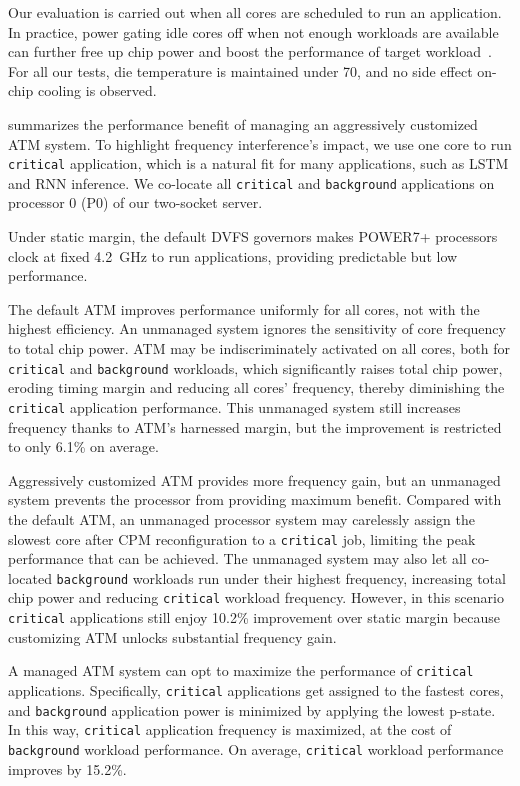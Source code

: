 Our evaluation is carried out when all cores are scheduled to run an application. In practice, power gating idle cores off when not enough workloads are available can further free up chip power and boost the performance of target workload~\cite{zu2015adaptive}. For all our tests, die temperature is maintained under 70\C, and no side effect on-chip cooling is observed. 

 summarizes the performance benefit of managing an aggressively customized ATM system. To highlight frequency interference's impact, we use one core to run \texttt{critical} application, which is a natural fit for many applications, such as LSTM and RNN inference. We co-locate all \texttt{critical} and \texttt{background} applications on processor 0 (P0) of our two-socket server.

Under static margin, the default DVFS governors makes POWER7+ processors clock at fixed 4.2~GHz to run applications, providing predictable but low performance. 

The default ATM improves performance uniformly for all cores, not with the highest efficiency. An unmanaged system ignores the sensitivity of core frequency to total chip power. ATM may be indiscriminately activated on all cores, both for \texttt{critical} and \texttt{background} workloads, which significantly raises total chip power, eroding timing margin and reducing all cores' frequency, thereby diminishing the \texttt{critical} application performance. This unmanaged system still increases frequency thanks to ATM's harnessed margin, but the improvement is restricted to only 6.1\% on average.

Aggressively customized ATM provides more frequency gain, but an unmanaged system prevents the processor from providing maximum benefit. Compared with the default ATM, an unmanaged processor system may carelessly assign the slowest core after CPM reconfiguration to a \texttt{critical} job, limiting the peak performance that can be achieved. The unmanaged system may also let all co-located \texttt{background} workloads run under their highest frequency, increasing total chip power and reducing \texttt{critical} workload frequency. However, in this scenario \texttt{critical} applications still enjoy 10.2\% improvement over static margin because customizing ATM unlocks substantial frequency gain.

A managed ATM system can opt to maximize the performance of \texttt{critical} applications. Specifically, \texttt{critical} applications get assigned to the fastest cores, and \texttt{background} application power is minimized by applying the lowest p-state. In this way, \texttt{critical} application frequency is maximized, at the cost of \texttt{background} workload performance. On average, \texttt{critical} workload performance improves by 15.2\%.

